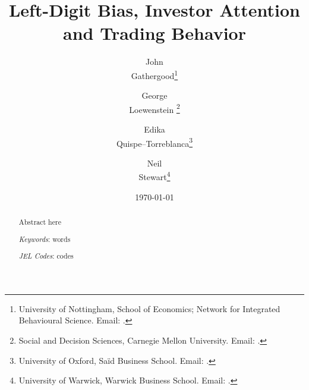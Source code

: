 
\title{\textbf{\Large{Left-Digit Bias, Investor Attention and Trading Behavior}}}

\singlespacing

\author{%
   John \\ Gathergood\thanks{University of Nottingham, School of Economics; Network for Integrated Behavioural Science. Email: .}%
   \and%
   George \\ Loewenstein%
   \thanks{Social and Decision Sciences, Carnegie Mellon University. Email: .}%
   \and%
   Edika \\ Quispe--Torreblanca\thanks{University of Oxford, Sa\"{i}d Business School. Email: .}%
    \and%
   Neil \\ Stewart\thanks{University of Warwick, Warwick Business School. Email: .}%
}

\date{%
	\vspace{1cm}\large%
	\today%
	\normalsize\\[1cm]%
}

\maketitle

\onehalfspacing

\begin{abstract}
   \noindent Abstract here
   
   \vspace{2ex}\noindent%
   \textit{Keywords}: words

   \vspace{.5ex}\noindent%
   \textit{JEL Codes}: codes%
\end{abstract}
